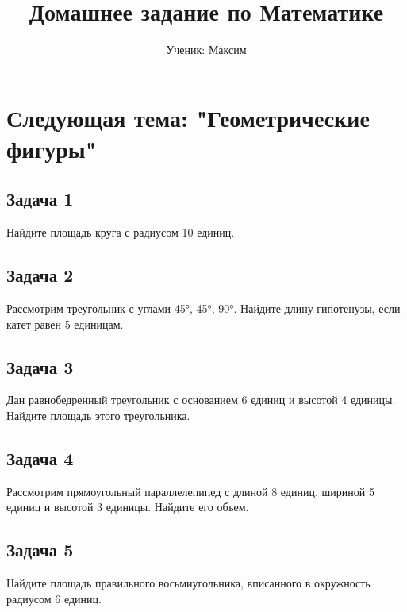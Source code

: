 \documentclass{article}
\begin{document}
\title{Домашнее задание по Математике}
\author{Ученик: Максим}
\date{}
\maketitle

\section*{Следующая тема: "Геометрические фигуры"}

\subsection*{Задача 1}
Найдите площадь круга с радиусом 10 единиц.

\subsection*{Задача 2}
Рассмотрим треугольник с углами 45°, 45°, 90°. Найдите длину гипотенузы, если катет равен 5 единицам.

\subsection*{Задача 3}
Дан равнобедренный треугольник с основанием 6 единиц и высотой 4 единицы. Найдите площадь этого треугольника.

\subsection*{Задача 4}
Рассмотрим прямоугольный параллелепипед с длиной 8 единиц, шириной 5 единиц и высотой 3 единицы. Найдите его объем.

\subsection*{Задача 5}
Найдите площадь правильного восьмиугольника, вписанного в окружность радиусом 6 единиц.
\end{document}
